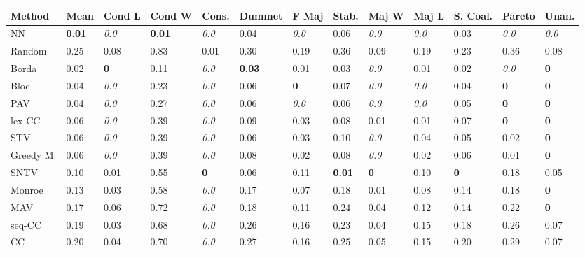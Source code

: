 \begin{tabular}{lllllllllllll}
\toprule
Method & Mean & Cond L & Cond W & Cons. & Dummet & F Maj & Stab. & Maj W & Maj L & S. Coal. & Pareto & Unan. \\
\midrule
NN & \textbf{0.01} & \textit{0.0} & \textbf{0.01} & \textit{0.0} & 0.04 & \textit{0.0} & 0.06 & \textit{0.0} & \textit{0.0} & 0.03 & \textit{0.0} & \textit{0.0} \\
Random & 0.25 & 0.08 & 0.83 & 0.01 & 0.30 & 0.19 & 0.36 & 0.09 & 0.19 & 0.23 & 0.36 & 0.08 \\
Borda & 0.02 & \textbf{0} & 0.11 & \textit{0.0} & \textbf{0.03} & 0.01 & 0.03 & \textit{0.0} & 0.01 & 0.02 & \textit{0.0} & \cellcolor{green!25}\textbf{0} \\
Bloc & 0.04 & \textit{0.0} & 0.23 & \textit{0.0} & 0.06 & \textbf{0} & 0.07 & \textit{0.0} & \textit{0.0} & 0.04 & \textbf{0} & \textbf{0} \\
PAV & 0.04 & \textit{0.0} & 0.27 & \textit{0.0} & 0.06 & \textit{0.0} & 0.06 & \textit{0.0} & \textit{0.0} & 0.05 & \cellcolor{green!25}\textbf{0} & \textbf{0} \\
lex-CC & 0.06 & \textit{0.0} & 0.39 & \textit{0.0} & 0.09 & 0.03 & 0.08 & 0.01 & 0.01 & 0.07 & \textbf{0} & \textbf{0} \\
STV & 0.06 & \textit{0.0} & 0.39 & \textit{0.0} & 0.06 & 0.03 & 0.10 & \textit{0.0} & 0.04 & 0.05 & 0.02 & \textbf{0} \\
Greedy M. & 0.06 & \textit{0.0} & 0.39 & \textit{0.0} & 0.08 & 0.02 & 0.08 & \textit{0.0} & 0.02 & 0.06 & 0.01 & \textbf{0} \\
SNTV & 0.10 & 0.01 & 0.55 & \textbf{0} & 0.06 & 0.11 & \textbf{0.01} & \textbf{0} & 0.10 & \textbf{0} & 0.18 & 0.05 \\
Monroe & 0.13 & 0.03 & 0.58 & \cellcolor{green!25}\textit{0.0} & 0.17 & 0.07 & 0.18 & 0.01 & 0.08 & 0.14 & 0.18 & \cellcolor{green!25}\textbf{0} \\
MAV & 0.17 & 0.06 & 0.72 & \textit{0.0} & 0.18 & 0.11 & 0.24 & 0.04 & 0.12 & 0.14 & 0.22 & \textbf{0} \\
seq-CC & 0.19 & 0.03 & 0.68 & \textit{0.0} & 0.26 & 0.16 & 0.23 & 0.04 & 0.15 & 0.18 & 0.26 & 0.07 \\
CC & 0.20 & 0.04 & 0.70 & \cellcolor{green!25}\textit{0.0} & 0.27 & 0.16 & 0.25 & 0.05 & 0.15 & 0.20 & 0.29 & 0.07 \\
\bottomrule
\end{tabular}

